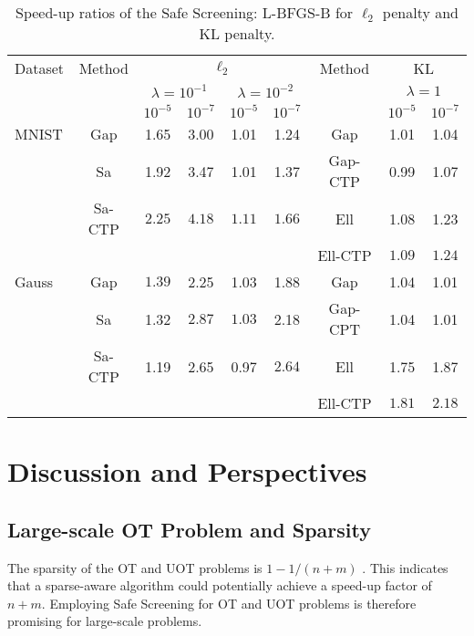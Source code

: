 \documentclass[11pt]{article}
\begin{document}
\begin{table}[h]
\caption{Speed-up ratios of the Safe Screening: L-BFGS-B for $\ell_2$ penalty and KL penalty.} 
\label{table:BFGS}
\centering
\begin{tabular}{l|c|cc|cc|c|cc}
\toprule
Dataset & Method & \multicolumn{4}{c|}{$\ell_2$} & Method & \multicolumn{2}{c}{KL} \\
& & \multicolumn{2}{c}{$\lambda=10^{-1}$} & \multicolumn{2}{c|}{$\lambda=10^{-2}$} & & \multicolumn{2}{c}{$\lambda=1$} \\
\cmidrule{3-6} \cmidrule{8-9}
& & $10^{-5}$ & $10^{-7}$ & $10^{-5}$ & $10^{-7}$ & & $ 10^{-5}$ & $10^{-7}$ \\
\midrule
MNIST & Gap & 1.65 & 3.00 & 1.01 & 1.24 & Gap & 1.01 & 1.04 \\
& Sa & 1.92 & 3.47 & 1.01 & 1.37 & Gap-CTP& 0.99 & 1.07 \\
& \!Sa-CTP\! & $\bm{2.25}$ & $\bm{4.18}$ & $\bm{1.11}$ & $\bm{1.66}$ & Ell & 1.08 & 1.23 \\
& & & & & & \!\!Ell-CTP\!\! & $\bm{1.09}$ & ${\bm{1.24}}$ \\
\midrule
Gauss & Gap & $\bm {1.39}$ & 2.25 & 1.03 & 1.88 & Gap & 1.04 & 1.01 \\
& Sa & 1.32 & ${\bm {2.87}}$ & ${\bm {1.03}}$ & 2.18 & Gap-CPT & 1.04 & 1.01 \\
& Sa-CTP & 1.19 & 2.65 & 0.97 & $\bm{2.64}$ & Ell & 1.75 & 1.87 \\
& & & & & & \!\!Ell-CTP\!\! & $\bm{1.81}$ & ${\bm {2.18}}$ \\
\bottomrule
\end{tabular}
\end{table}

\section{Discussion and Perspectives}

\subsection{Large-scale OT Problem and Sparsity}
The sparsity of the OT and UOT problems is $1 - 1/(n+m)$ \cite{doi:10.1137/16M1106018}. This indicates that a sparse-aware algorithm could potentially achieve a speed-up factor of $n+m$. Employing Safe Screening for OT and UOT problems is therefore promising for large-scale problems.
\end{document}
